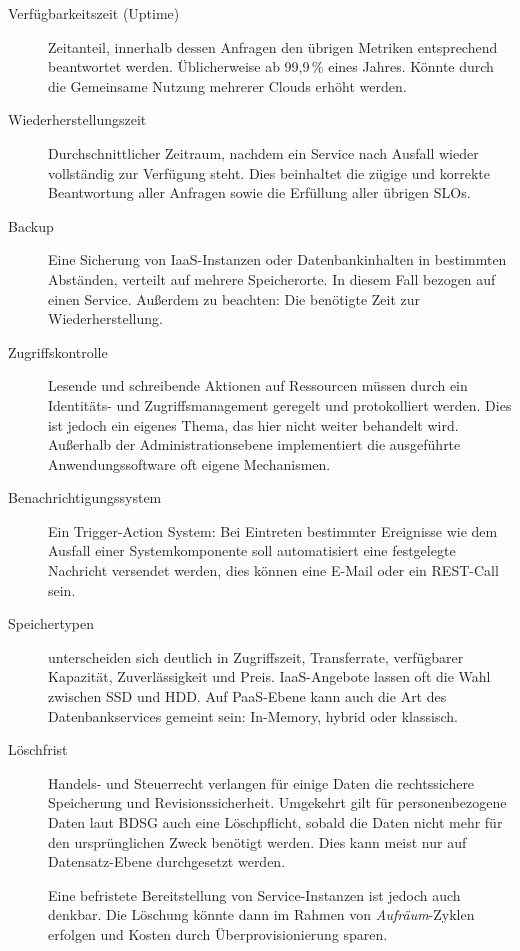 \begin{description}
	\item[Verfügbarkeitszeit (Uptime)] Zeitanteil, innerhalb dessen Anfragen den übrigen Metriken entsprechend beantwortet werden. Üblicherweise ab 99,9\,\% eines Jahres. Könnte durch die Gemeinsame Nutzung mehrerer Clouds erhöht werden.	
	
	\item[Wiederherstellungszeit] Durchschnittlicher Zeitraum, nachdem ein Service nach Ausfall wieder vollständig zur Verfügung steht. Dies beinhaltet die zügige und korrekte Beantwortung aller Anfragen sowie die Erfüllung aller übrigen SLOs.
	
	\item[Backup] Eine Sicherung von IaaS-Instanzen oder Datenbankinhalten in bestimmten Abständen, verteilt auf mehrere Speicherorte. In diesem Fall bezogen auf einen Service. Außerdem zu beachten: Die benötigte Zeit zur Wiederherstellung.
	
	\item[Zugriffskontrolle] Lesende und schreibende Aktionen auf Ressourcen müssen durch ein Identitäts- und Zugriffsmanagement geregelt und protokolliert werden. Dies ist jedoch ein eigenes Thema, das hier nicht weiter behandelt wird. Außerhalb der Administrationsebene implementiert die ausgeführte Anwendungssoftware oft eigene Mechanismen.
		
	\item[Benachrichtigungssystem] Ein Trigger-Action System: Bei Eintreten bestimmter Ereignisse wie dem Ausfall einer Systemkomponente soll automatisiert eine festgelegte Nachricht versendet werden, dies können eine E-Mail oder ein REST-Call sein.
	
	\item[Speichertypen] unterscheiden sich deutlich in Zugriffszeit, Transferrate, verfügbarer Kapazität, Zuverlässigkeit und Preis. IaaS-Angebote lassen oft die Wahl zwischen SSD und HDD. Auf PaaS-Ebene kann auch die Art des Datenbankservices gemeint sein: In-Memory, hybrid oder klassisch.
	
	\item[Löschfrist] Handels- und Steuerrecht verlangen für einige Daten die rechtssichere Speicherung und Revisionssicherheit. Umgekehrt gilt für personenbezogene Daten laut BDSG auch eine Löschpflicht, sobald die Daten nicht mehr für den ursprünglichen Zweck benötigt werden. Dies kann meist nur auf Datensatz-Ebene durchgesetzt werden. 
	
	Eine befristete Bereitstellung von Service-Instanzen ist jedoch auch denkbar. Die Löschung könnte dann im Rahmen von \emph{Aufräum}-Zyklen erfolgen und Kosten durch Überprovisionierung sparen.
	

\end{description}
